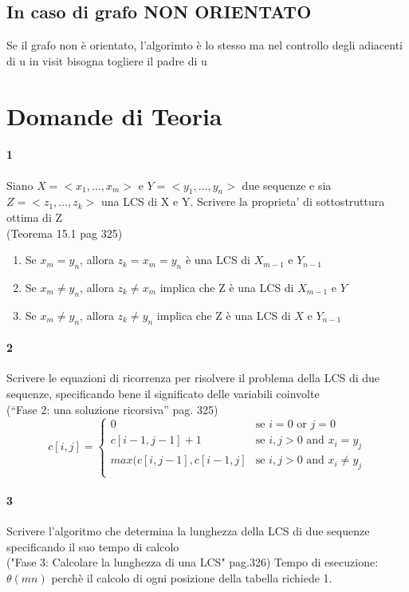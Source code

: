 \documentclass[12pt, a4paper, openany]{book}
\begin{document}
	\subsection*{In caso di grafo NON ORIENTATO}
	Se il grafo non è orientato, l'algorimto è lo stesso ma nel controllo degli adiacenti di u in visit bisogna togliere il padre di u

	\section{Domande di Teoria}
	\paragraph{1}
	Siano $X=< x_1, …, x_m>$ e $Y=< y_1, …, y_n>$ due sequenze e sia $Z=< z_1, …, z_k>$
	una LCS di X e Y. Scrivere la proprieta’ di sottostruttura ottima di Z \\
	(Teorema 15.1 pag 325)
	\begin{enumerate}
		\item Se $x_m = y_n$, allora $z_k = x_m =y_n$ è  una LCS di $X_{m-1}$ e $Y_{n-1}$
		\item Se $x_m \neq y_n$, allora $z_k \neq x_m$ implica che Z è una LCS di $X_{m-1}$ e $Y$
		\item Se $x_m \neq y_n$, allora $z_k \neq y_n$ implica che Z è una LCS di $X$ e $Y_{n-1}$

	\end{enumerate}
	\paragraph{2}
	Scrivere le equazioni di ricorrenza per risolvere il problema della LCS di due
	sequenze, specificando bene il significato delle variabili coinvolte \\
	(“Fase 2: una soluzione ricorsiva” pag. 325)
	\begin{equation*}
		c[i,j] = \begin{cases}
			0                      & \text{se $i = 0$ or $j = 0$}           \\
			c[i-1,j-1] + 1         & \text{se $i,j > 0$ and $x_i = y_j$}    \\
			max(c[i,j-1], c[i-1,j] & \text{se $i,j > 0$ and $x_i \neq y_j$} \\
		\end{cases}
	\end{equation*}
	\paragraph{3}
	Scrivere l’algoritmo che determina la lunghezza della LCS di due sequenze
	specificando il suo tempo di calcolo\\
	("Fase 3: Calcolare la lunghezza di una LCS" pag.326)
	Tempo di esecuzione: $\theta(mn)$ perchè il calcolo di ogni posizione della tabella richiede 1.
\end{document}
